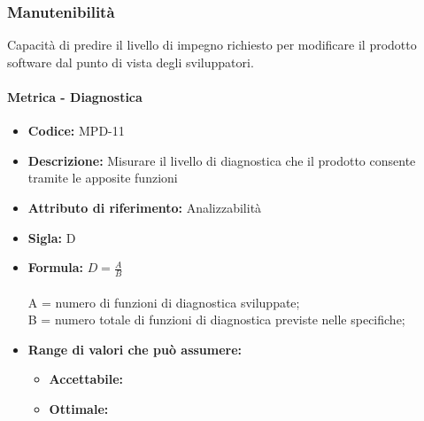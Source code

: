       
      
      
      
           
    \subsubsection{Manutenibilità} 
    Capacità di predire il livello di impegno richiesto per modificare il prodotto software dal punto di vista degli sviluppatori.
    
        \paragraph{Metrica - Diagnostica} 
           \begin{itemize}
          \item  \textbf{Codice:} MPD-11
          \item  \textbf{Descrizione:} Misurare il livello di diagnostica che il prodotto consente tramite le apposite funzioni 
          \item  \textbf{Attributo di riferimento:} Analizzabilità
         \item   \textbf{Sigla:} D
          \item  \textbf{Formula:} \begin{math}D = \frac{A}{B}\end{math}\\ \\
            A = numero di funzioni di diagnostica sviluppate;\\
            B = numero totale di funzioni di diagnostica previste nelle specifiche;
                 \item \textbf{Range di valori che può assumere:}
        \begin{itemize}
            \item \textbf{Accettabile:} 
            \item \textbf{Ottimale:} 
        \end{itemize}
       \end{itemize}
              
           
